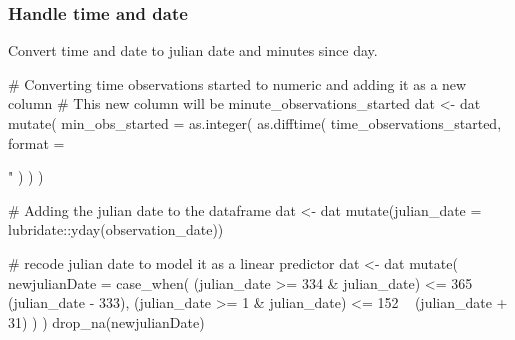 \documentclass[
]{article}
\newenvironment{Shaded}{}{}
\newcommand{\CommentTok}[1]{\textcolor[rgb]{0.00,0.50,0.00}{#1}}
\newcommand{\DataTypeTok}[1]{#1}
\newcommand{\DecValTok}[1]{#1}
\newcommand{\KeywordTok}[1]{\textcolor[rgb]{0.00,0.00,1.00}{#1}}
\newcommand{\NormalTok}[1]{#1}
\newcommand{\OperatorTok}[1]{#1}
\newcommand{\StringTok}[1]{\textcolor[rgb]{0.00,0.50,0.50}{#1}}
\begin{document}
\hypertarget{handle-time-and-date}{%
\subsubsection{Handle time and date}\label{handle-time-and-date}}

Convert time and date to julian date and minutes since day.

\begin{Shaded}
\begin{Highlighting}[]
\CommentTok{# Converting time observations started to numeric and adding it as a new column}
\CommentTok{# This new column will be minute_observations_started}
\NormalTok{dat <-}
\StringTok{  }\NormalTok{dat }\OperatorTok{%
\StringTok{  }\KeywordTok{mutate}\NormalTok{(}
    \DataTypeTok{min_obs_started =} \KeywordTok{as.integer}\NormalTok{(}
      \KeywordTok{as.difftime}\NormalTok{(}
\NormalTok{        time_observations_started,}
        \DataTypeTok{format =} \StringTok{"%
\NormalTok{      )}
\NormalTok{    )}
\NormalTok{  )}

\CommentTok{# Adding the julian date to the dataframe}
\NormalTok{dat <-}\StringTok{ }\NormalTok{dat }\OperatorTok{%
\StringTok{  }\KeywordTok{mutate}\NormalTok{(}\DataTypeTok{julian_date =}\NormalTok{ lubridate}\OperatorTok{::}\KeywordTok{yday}\NormalTok{(observation_date))}

\CommentTok{# recode julian date to model it as a linear predictor}
\NormalTok{dat <-}\StringTok{ }\NormalTok{dat }\OperatorTok{%
\StringTok{  }\KeywordTok{mutate}\NormalTok{(}
    \DataTypeTok{newjulianDate =}
      \KeywordTok{case_when}\NormalTok{(}
\NormalTok{        (julian_date }\OperatorTok{>=}\StringTok{ }\DecValTok{334} \OperatorTok{&}\StringTok{ }\NormalTok{julian_date) }\OperatorTok{<=}\StringTok{ }\DecValTok{365} \OperatorTok{~}
\StringTok{        }\NormalTok{(julian_date }\OperatorTok{-}\StringTok{ }\DecValTok{333}\NormalTok{),}
\NormalTok{        (julian_date }\OperatorTok{>=}\StringTok{ }\DecValTok{1} \OperatorTok{&}\StringTok{ }\NormalTok{julian_date) }\OperatorTok{<=}\StringTok{ }\DecValTok{152} \OperatorTok{~}
\StringTok{        }\NormalTok{(julian_date }\OperatorTok{+}\StringTok{ }\DecValTok{31}\NormalTok{)}
\NormalTok{      )}
\NormalTok{  ) }\OperatorTok{%
\StringTok{  }\KeywordTok{drop_na}\NormalTok{(newjulianDate)}

}}}}}
\end{Highlighting}
\end{Shaded}
\end{document}
